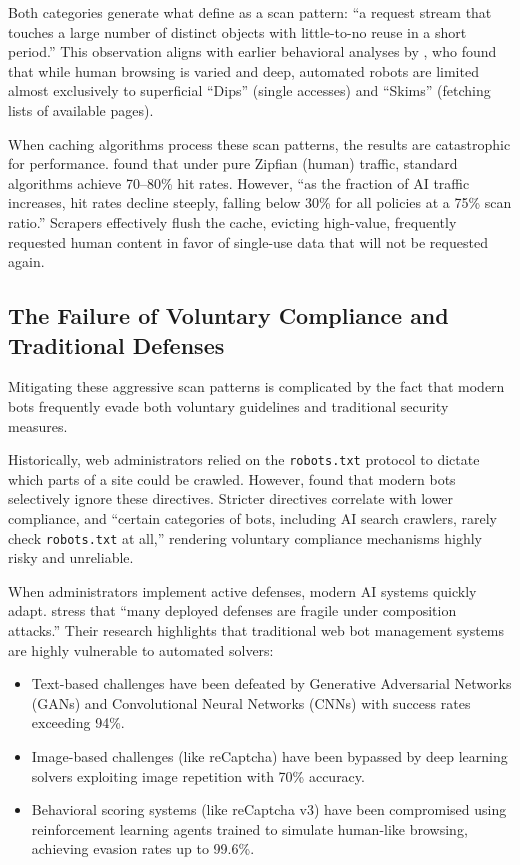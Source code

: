 Both categories generate what  define as a scan pattern: ``a request stream that touches a large number of distinct objects with little-to-no reuse in a short period.'' This observation aligns with earlier behavioral analyses by , who found that while human browsing is varied and deep, automated robots are limited almost exclusively to superficial ``Dips'' (single accesses) and ``Skims'' (fetching lists of available pages).

When caching algorithms process these scan patterns, the results are catastrophic for performance.  found that under pure Zipfian (human) traffic, standard algorithms achieve 70--80\% hit rates. However, ``as the fraction of AI traffic increases, hit rates decline steeply, falling below 30\% for all policies at a 75\% scan ratio.'' Scrapers effectively flush the cache, evicting high-value, frequently requested human content in favor of single-use data that will not be requested again.

\subsection{The Failure of Voluntary Compliance and Traditional Defenses}
Mitigating these aggressive scan patterns is complicated by the fact that modern bots frequently evade both voluntary guidelines and traditional security measures.

Historically, web administrators relied on the \texttt{robots.txt} protocol to dictate which parts of a site could be crawled. However,  found that modern bots selectively ignore these directives. Stricter directives correlate with lower compliance, and ``certain categories of bots, including AI search crawlers, rarely check \texttt{robots.txt} at all,'' rendering voluntary compliance mechanisms highly risky and unreliable.

When administrators implement active defenses, modern AI systems quickly adapt.  stress that ``many deployed defenses are fragile under composition attacks.'' Their research highlights that traditional web bot management systems are highly vulnerable to automated solvers:
\begin{itemize}
    \item Text-based challenges have been defeated by Generative Adversarial Networks (GANs) and Convolutional Neural Networks (CNNs) with success rates exceeding 94\%.
    \item Image-based challenges (like reCaptcha) have been bypassed by deep learning solvers exploiting image repetition with 70\% accuracy.
    \item Behavioral scoring systems (like reCaptcha v3) have been compromised using reinforcement learning agents trained to simulate human-like browsing, achieving evasion rates up to 99.6\%.
\end{itemize}

